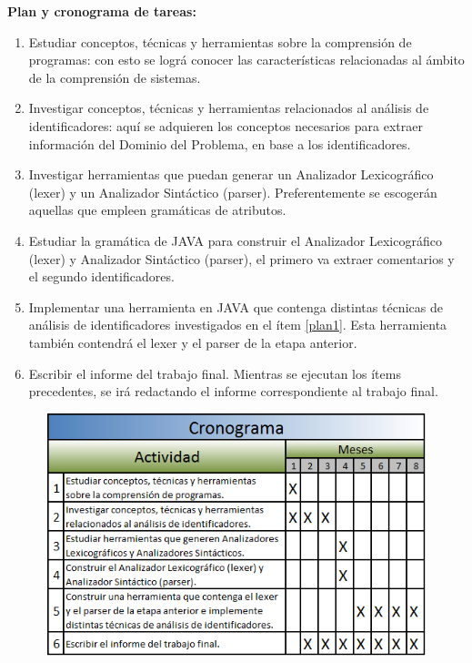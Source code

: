 \documentclass[a4paper,12pt]{report}
\begin{document}
{\large \textbf{Plan y cronograma de tareas:}}

\begin{enumerate}
\itemsep0em%
\item Estudiar conceptos, técnicas y herramientas sobre la comprensión de programas: con esto se lográ conocer las características relacionadas al ámbito de la comprensión de sistemas.

\item\label{plan1} Investigar conceptos, técnicas y herramientas relacionados al análisis de identificadores: aquí se adquieren los conceptos necesarios para extraer información del Dominio del Problema, en base a los identificadores.


\item Investigar herramientas que puedan generar un Analizador Lexicográfico (lexer) y un Analizador Sintáctico (parser). Preferentemente se escogerán aquellas que empleen gramáticas de atributos.

\item Estudiar la gramática de JAVA para construir el Analizador Lexicográfico (lexer) y Analizador Sintáctico (parser), el primero va extraer comentarios y el segundo identificadores.

\item Implementar una herramienta en JAVA que  contenga distintas técnicas de análisis de identificadores investigados en el ítem \ref{plan1}. Esta herramienta también contendrá el lexer y el parser de la etapa anterior.

\item Escribir el informe del trabajo final. Mientras se ejecutan los ítems precedentes, se irá redactando el informe correspondiente al trabajo final.
\end{enumerate}


\begin{figure}[h] %
\centerline{%
\includegraphics[width=380pt,height=200pt]{./crono.png}
}
\end{figure} 
\end{document}
